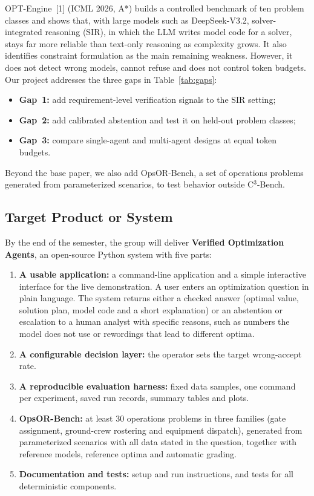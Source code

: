 \documentclass[11pt,a4paper]{article}
\newcommand{\cthree}{C$^3$-Bench}
\begin{document}
OPT-Engine~[1] (ICML 2026, A*) builds a controlled benchmark of ten problem classes and shows that, with large models such as DeepSeek-V3.2, solver-integrated reasoning (SIR), in which the LLM writes model code for a solver, stays far more reliable than text-only reasoning as complexity grows. It also identifies constraint formulation as the main remaining weakness. However, it does not detect wrong models, cannot refuse and does not control token budgets. Our project addresses the three gaps in Table~\ref{tab:gaps}:
\begin{itemize}[leftmargin=1.6em]
\item \textcolor{gapone}{\textbf{Gap~1:}} add requirement-level verification signals to the SIR setting;
\item \textcolor{gaptwo}{\textbf{Gap~2:}} add calibrated abstention and test it on held-out problem classes;
\item \textcolor{gapthree}{\textbf{Gap~3:}} compare single-agent and multi-agent designs at equal token budgets.
\end{itemize}
Beyond the base paper, we also add OpsOR-Bench, a set of operations problems generated from parameterized scenarios, to test behavior outside \cthree.

\subsection{Target Product or System}

By the end of the semester, the group will deliver \textbf{Verified Optimization Agents}, an open-source Python system with five parts:
\begin{enumerate}[leftmargin=1.6em]
\item \textbf{A usable application:} a command-line application and a simple interactive interface for the live demonstration. A user enters an optimization question in plain language. The system returns either a checked answer (optimal value, solution plan, model code and a short explanation) or an abstention or escalation to a human analyst with specific reasons, such as numbers the model does not use or rewordings that lead to different optima.
\item \textbf{A configurable decision layer:} the operator sets the target wrong-accept rate.
\item \textbf{A reproducible evaluation harness:} fixed data samples, one command per experiment, saved run records, summary tables and plots.
\item \textbf{OpsOR-Bench:} at least 30 operations problems in three families (gate assignment, ground-crew rostering and equipment dispatch), generated from parameterized scenarios with all data stated in the question, together with reference models, reference optima and automatic grading.
\item \textbf{Documentation and tests:} setup and run instructions, and tests for all deterministic components.
\end{enumerate}
\end{document}

